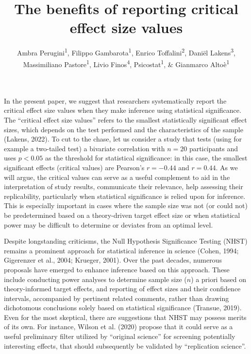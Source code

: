 \documentclass[
  man]{apa7}
\title{The benefits of reporting critical effect size values}
\author{Ambra Perugini\textsuperscript{1}, Filippo Gambarota\textsuperscript{1}, Enrico Toffalini\textsuperscript{2}, Daniël Lakens\textsuperscript{3}, Massimiliano Pastore\textsuperscript{1}, Livio Finos\textsuperscript{4}, Psicostat\textsuperscript{1}, \& Gianmarco Altoè\textsuperscript{1}}
\date{}
\affiliation{\vspace{0.5cm}\textsuperscript{1} Department of Developmental and Social Psychology, University of Padova, Italy\\\textsuperscript{2} Department of General Psychology, University of Padova, Italy\\\textsuperscript{3} Eindhoven University of Technology, Netherlands\\\textsuperscript{4} Department of Statistics, University of Padova, Italy}
\begin{document}
\maketitle

In the present paper, we suggest that researchers systematically report the critical effect size values when they make inference using statistical significance. The ``critical effect size values'' refers to the smallest statistically significant effect sizes, which depends on the test performed and the characteristics of the sample (Lakens, 2022). To cut to the chase, let us consider a study that tests (using for example a two-tailed test) a bivariate correlation with \(n = 20\) participants and uses \(p < 0.05\) as the threshold for statistical significance: in this case, the smallest significant effects (critical values) are Pearson's \(r = -0.44\) and \(r = 0.44\). As we will argue, the critical values can serve as a useful complement to aid in the interpretation of study results, communicate their relevance, help assessing their replicability, particularly when statistical significance is relied upon for inference. This is especially important in cases where the sample size was not (or could not) be predetermined based on a theory-driven target effect size or when statistical power may be difficult to determine or deviates from an optimal level.

Despite longstanding criticisms, the Null Hypothesis Significance Testing (NHST) remains a prominent approach for statistical inference in science (Cohen, 1994; Gigerenzer et al., 2004; Krueger, 2001). Over the past decades, numerous proposals have emerged to enhance inference based on this approach. These include conducting power analyses to determine sample size (\(n\)) a priori based on theory-informed target effects, and reporting of effect sizes and their confidence intervals, accompanied by pertinent related comments, rather than drawing dichotomous conclusions solely based on statistical significance (Transue, 2019). Even for the most skeptical, there are suggestions that NHST may possess merits of its own. For instance, Wilson et al. (2020) propose that it could serve as a useful preliminary filter utilized by ``original science'' for screening potentially interesting effects, that should subsequently be validated by ``replication science''.
\end{document}
